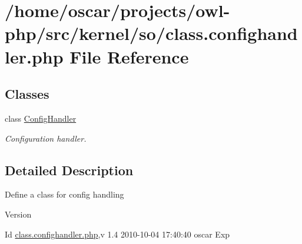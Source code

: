 \section{/home/oscar/projects/owl-\/php/src/kernel/so/class.confighandler.php File Reference}
\label{class_8confighandler_8php}
\subsection*{Classes}
\begin{DoxyCompactItemize}
\item 
class \hyperlink{classConfigHandler}{ConfigHandler}
\begin{DoxyCompactList}\small\item\em Configuration handler. \item\end{DoxyCompactList}\end{DoxyCompactItemize}


\subsection{Detailed Description}
Define a class for config handling \begin{DoxyVersion}{Version}

\end{DoxyVersion}
\begin{DoxyParagraph}{Id}
\hyperlink{class_8confighandler_8php}{class.confighandler.php},v 1.4 2010-\/10-\/04 17:40:40 oscar Exp 
\end{DoxyParagraph}
